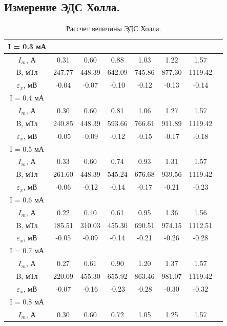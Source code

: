 \documentclass[a4paper,12pt]{article} %
\begin{document}
\subsection{Измерение ЭДС Холла.}

\begin{table}[H]
\caption{\label{tab:canonsummary} Рассчет величины ЭДС Холла.}
\begin{center}
\begin{tabular}{|c|c|c|c|c|c|c|c|}
\hline
I = 0.3 мА&&&&&&\\
\hline
$I_m$, А & 0.31 & 0.60 & 0.88 & 1.03 & 1.22 & 1.57 \\
\hline
B, мТл & 247.77 & 448.39 & 642.09 & 745.86 & 877.30 & 1119.42 \\ 
\hline
$\varepsilon_x$, мВ & -0.04 & -0.07 & -0.10 & -0.12 & -0.13 & -0.14 \\ 
\hline
I = 0.4 мА&&&&&&\\
\hline
$I_m$, А & 0.30 & 0.60 & 0.81 & 1.06 & 1.27 & 1.57 \\
\hline
B, мТл & 240.85 & 448.39 & 593.66 & 766.61 & 911.89 & 1119.42 \\
\hline
$\varepsilon_x$, мВ & -0.05 & -0.09 & -0.12 & -0.15 & -0.17 & -0.18 \\ 
\hline
I = 0.5 мА&&&&&&\\
\hline
$I_m$, А & 0.33 & 0.60 & 0.74 & 0.93 & 1.31 & 1.57 \\ 
\hline
B, мТл & 261.60 & 448.39 & 545.24 & 676.68 & 939.56 & 1119.42\\ 
\hline
$\varepsilon_x$, мВ & -0.06 & -0.12 & -0.14 & -0.17 & -0.21 & -0.23 \\
\hline
I = 0.6 мА&&&&&&\\
\hline
$I_m$, А & 0.22 & 0.40 & 0.61 & 0.95 & 1.36 & 1.56 \\ 
\hline
B, мТл & 185.51 & 310.03 & 455.30 & 690.51 & 974.15 & 1112.51 \\ 
\hline
$\varepsilon_x$, мВ & -0.05 & -0.09 & -0.14 & -0.21 & -0.26 & -0.28 \\ 
\hline
I = 0.7 мА&&&&&&\\
\hline
$I_m$, А & 0.27 & 0.61 & 0.90 & 1.20 & 1.37 & 1.57 \\
\hline
B, мТл & 220.09 & 455.30 & 655.92 & 863.46 & 981.07 & 1119.42 \\ 
\hline
$\varepsilon_x$, мВ & -0.07 & -0.16 & -0.23 & -0.28 & -0.30 & -0.32 \\
\hline
I = 0.8 мА&&&&&&\\
\hline
$I_m$, А & 0.30 & 0.60 & 0.72 & 1.05 & 1.25 & 1.57 \\

\end{tabular}
\end{center}
\end{table}
\end{document}

